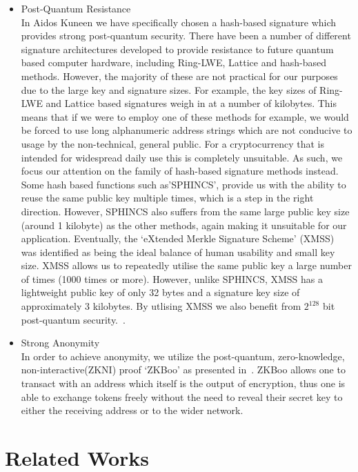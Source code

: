 \documentclass[a4paper,10pt,twocolumn]{article}
\begin{document}
\begin{itemize}
\item{Post-Quantum Resistance}\mbox{}\\ 
In Aidos Kuneen we have specifically chosen a hash-based signature which provides strong post-quantum security. There have been a 
number of different signature architectures developed to provide resistance to future quantum based computer hardware, including 
Ring-LWE, Lattice and hash-based methods. However, the majority of these are not practical for our purposes due to the large key and 
signature sizes. For example, the key sizes of Ring-LWE and Lattice based signatures weigh in at a number of kilobytes. This means that 
if we were to employ one of these methods for example, we would be forced to use long alphanumeric address strings which are not 
conducive to usage by the non-technical, general public. For a cryptocurrency that is intended for widespread daily use this is 
completely unsuitable. As such, we focus our attention on the family of hash-based signature methods instead. Some hash based functions 
such as'SPHINCS', provide us with the ability to reuse the same public key multiple times, which is a step in the right direction. 
However, SPHINCS also suffers from the same large public key size (around 1 kilobyte) as the other methods, again making it unsuitable 
for our application. Eventually, the `eXtended Merkle Signature Scheme' (XMSS) was identified as being the ideal balance of human 
usability and small key size. XMSS allows us to repeatedly utilise the same public key a large number of times (1000 times or more). 
However, unlike SPHINCS, XMSS has a lightweight public key of only 32 bytes and a signature key size of approximately 3 kilobytes. By utlising XMSS we also benefit from \( 2^{128} \) bit post-quantum security.~\cite{recom}.

\item{Strong Anonymity}\mbox{}\\ 
In order to achieve anonymity, we utilize the post-quantum, zero-knowledge, non-interactive(ZKNI) proof `ZKBoo' as presented 
in~\cite{zkboo}. ZKBoo allows one to transact with an address which itself is the output of encryption, thus one is able to exchange 
tokens freely without the need to reveal their secret key to either the receiving address or to the wider network.
\end{itemize}

\section{Related Works}
\end{document}
